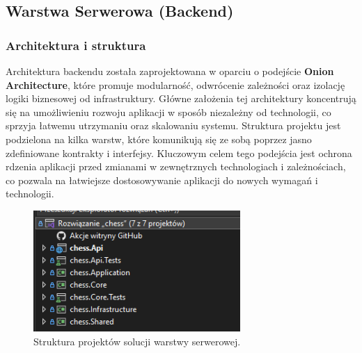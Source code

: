 \documentclass[12pt,a4paper]{article}
\begin{document}
\newpage

\subsection{Warstwa Serwerowa (Backend)} 

\subsubsection{Architektura i struktura} 

Architektura backendu została zaprojektowana w oparciu o podejście \textbf{Onion Architecture}, które promuje modularność, odwrócenie zależności oraz izolację logiki biznesowej od infrastruktury. Główne założenia tej architektury koncentrują się na umożliwieniu rozwoju aplikacji w sposób niezależny od technologii, co sprzyja łatwemu utrzymaniu oraz skalowaniu systemu. Struktura projektu jest podzielona na kilka warstw, które komunikują się ze sobą poprzez jasno zdefiniowane kontrakty i interfejsy. Kluczowym celem tego podejścia jest ochrona rdzenia aplikacji przed zmianami w zewnętrznych technologiach i zależnościach, co pozwala na łatwiejsze dostosowywanie aplikacji do nowych wymagań i technologii.

\vspace{0.5cm}
\begin{figure}[h!] 
    \centering 
    \includegraphics[width=0.7\textwidth]{images/struktura_back.png} 
    \caption{Struktura projektów solucji warstwy serwerowej.} 
\end{figure}
\vspace{0.5cm}
\end{document}
